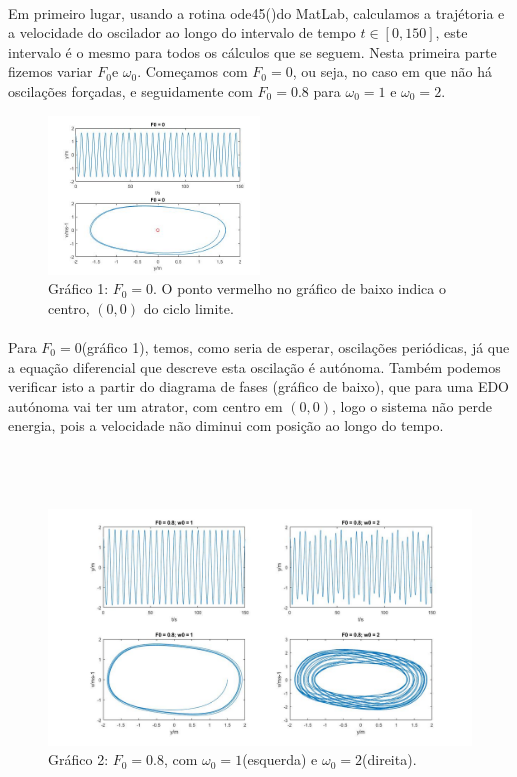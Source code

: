 \documentclass[a4paper, 11pt]{article}
\newcommand{\ode}{{\fontfamily{pcr}\selectfont ode45()}}
\newcommand{\f}{$F_{0}$}
\newcommand{\w}{$\omega_{0}$}
\begin{document}
	\paragraph{}
	Em primeiro lugar, usando a rotina \ode do MatLab, calculamos a trajétoria e a velocidade do oscilador ao longo do intervalo de tempo $t\in [0, 150]$, este intervalo é o mesmo para todos os cálculos que se seguem.
	Nesta primeira parte fizemos variar \f e \w. Começamos com \f$=0$, ou seja, no caso em que não há oscilações forçadas, e seguidamente com \f$=0.8$ para \w$=1$ e \w$=2$.\\
	\begin{figure}[h]
		\centering
		\captionsetup{labelformat=empty}
		\includegraphics[width=0.5\textwidth, height=0.3\textwidth]{f0_0_phase}
		\caption{\scriptsize Gráfico 1: \f$=0$. O ponto vermelho no gráfico de baixo indica o centro, $(0, 0)$ do ciclo limite.}
	\end{figure}
	\paragraph{}
	Para \f$=0$(gráfico 1), temos, como seria de esperar, oscilações periódicas, já que a equação diferencial que descreve esta oscilação é autónoma. Também podemos verificar isto a partir do diagrama de fases (gráfico de baixo), que para uma EDO autónoma vai ter um atrator, com centro em $(0, 0)$, logo o sistema não perde energia, pois a velocidade não diminui com posição ao longo do tempo.
	\\ \\ \\ \\
	\begin{figure}[h]
		\centering
		\captionsetup{labelformat=empty}
		\includegraphics[width=\textwidth, height=0.4\textwidth]{f0_08_phase}
		\caption{\scriptsize Gráfico 2: \f$=0.8$, com \w$=1$(esquerda) e \w$=2$(direita).}
	\end{figure}
\end{document}
